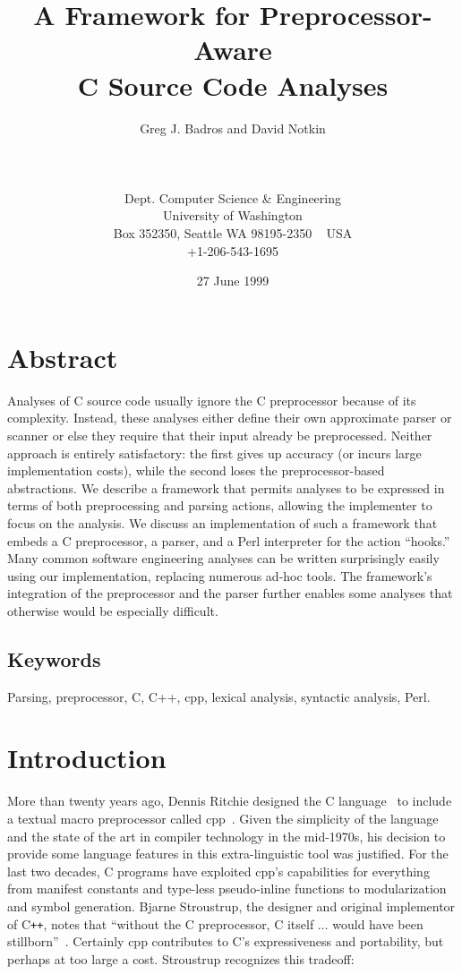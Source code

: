 \documentclass{article}
\title{A Framework for Preprocessor-Aware \\ C Source Code Analyses}
\author{
        \hspace*{-2ex}
        \parbox{4in} {\begin{center}
        Greg J. Badros and David Notkin\\
        \end{center}}\\
        \parbox{4in} {\begin{center}
            \begin{small}
              Dept. Computer Science \& Engineering\\
              University of Washington \\
              Box 352350, Seattle WA  98195-2350 ~ USA \\
              +1-206-543-1695\\
              \email{\{gjb,notkin\}@cs.washington.edu}
            \end{small}
        \end{center} }
}
\date{27 June 1999}
\newcommand{\Cpp}{\mbox{\textsf{cpp}}}
\newcommand{\CPP}{\mbox{C\texttt{++}}}
\newcommand{\C}{\mbox{C}}
\begin{document}
\maketitle

\thispagestyle{empty}  %

\pagestyle{plain}

\section*{Abstract}
\label{sec:abstract}
Analyses of \C{} source code usually ignore the \C{} preprocessor
because of its complexity.  Instead, these analyses either define their
own approximate parser or scanner or else they require that their
input already be preprocessed.  Neither approach is entirely
satisfactory: the first gives up accuracy (or incurs large
implementation costs), while the second loses the preprocessor-based
abstractions.  We describe a framework that permits analyses to be
expressed in terms of both preprocessing and parsing actions, allowing
the implementer to focus on the analysis.  We discuss an implementation of
such a framework that embeds a \C{} preprocessor, a parser, and a Perl
interpreter for the action ``hooks.''  Many common software engineering
analyses can be written surprisingly easily using our implementation,
replacing numerous ad-hoc tools.  The framework's integration of the
preprocessor and the parser further enables some analyses that otherwise
would be especially difficult.

\subsection*{Keywords}
Parsing, preprocessor, C, C++, cpp, lexical analysis, syntactic analysis, Perl.

\bigskip

\section{Introduction}
\label{sec:intro}
More than twenty years ago, Dennis Ritchie designed the \C{}
language~\cite{Kernighan88} to include a textual macro preprocessor
called \Cpp{}~\cite[Ch.~3]{Harbison91}.  Given the simplicity of the
language and the state of the art in compiler technology in the
mid-1970s, his decision to provide some language features in this
extra-linguistic tool was justified.  For the last two
decades, \C{} programs have exploited \Cpp{}'s capabilities for
everything from manifest constants and type-less pseudo-inline
functions to modularization and symbol generation.  Bjarne
Stroustrup, the designer and original implementor of \CPP{}, notes that
``without the \C{} preprocessor, \C{} itself $\ldots$ would have been
stillborn''~\cite[p.~119]{Stroustrup94}.  Certainly \Cpp{} contributes
to \C{}'s expressiveness and portability, but perhaps at too large a
cost.  Stroustrup recognizes this tradeoff:
\end{document}
